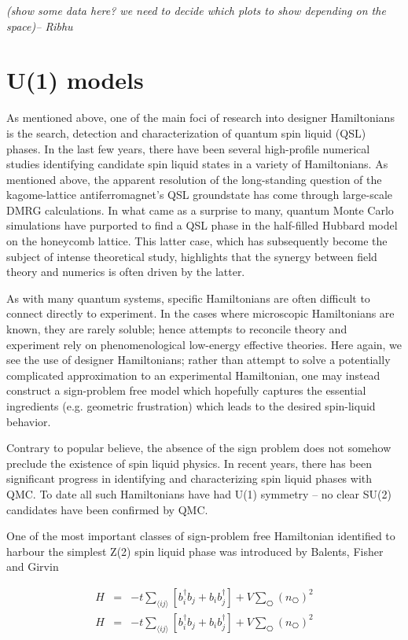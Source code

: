 \documentclass[aps,prb,groupedaddress,twocolumn]{revtex4}
\begin{document}
{\em (show some data here? we need to decide which plots to show
  depending on the space)-- Ribhu}
\section{U(1) models}

As mentioned above, one of the main foci of research into designer Hamiltonians is the search, detection and characterization of quantum spin liquid (QSL) phases.  In the last few years, there have been several high-profile numerical studies identifying candidate spin liquid states in a variety of Hamiltonians.  As mentioned above, the apparent resolution of the long-standing question of the kagome-lattice antiferromagnet's QSL groundstate has come through large-scale DMRG calculations.  In what came as a surprise to many, quantum Monte Carlo simulations have purported to find a QSL phase in the half-filled Hubbard model on the honeycomb lattice.  This latter case, which has subsequently become the subject of intense theoretical study, highlights that the synergy between field theory and numerics is often driven by the latter.

As with many quantum systems, specific Hamiltonians are often difficult to connect directly to experiment.  In the cases where microscopic Hamiltonians are known, they are rarely soluble; hence attempts to reconcile theory and experiment rely on phenomenological low-energy effective theories.  Here again, we see the use of designer Hamiltonians; rather than attempt to solve a potentially complicated approximation to an experimental Hamiltonian, one may instead construct a sign-problem free model which hopefully captures the essential ingredients (e.g. geometric frustration) which leads to the desired spin-liquid behavior.

Contrary to popular believe, the absence of the sign problem does not somehow preclude the existence of spin liquid physics.  In recent years, there has been significant progress in identifying and characterizing spin liquid phases with QMC.  To date all such Hamiltonians have had U(1) symmetry -- no clear SU(2) candidates have been confirmed by QMC.  

One of the most important classes of sign-problem free Hamiltonian identified to harbour the simplest Z(2) spin liquid phase was introduced by Balents, Fisher and Girvin\cite{BFG}

\begin{eqnarray}
H &=& -t \sum_{\langle ij \rangle} [b^{\dagger}_i b_j + b_i b^{\dagger}_j] + V \sum_{\hexagon} (n_{\hexagon})^2 \\
H &=& -t \sum_{\langle ij \rangle} [b^{\dagger}_i b_j + b_i b^{\dagger}_j] + V \sum_{\hexagon} (n_{\hexagon})^2 
\end{eqnarray}
\end{document}
